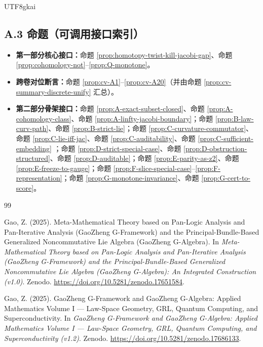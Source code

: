 \documentclass[12pt]{article}
\begin{document}
\begin{CJK*}{UTF8}{gkai}
\subsection*{A.3 命题（可调用接口索引）}
\begin{itemize}
  \item \textbf{第一部分核心接口：}命题 \ref{prop:homotopy-twist-kill-jacobi-gap}、命题 \ref{prop:cohomology-not}--\ref{prop:Q-monotone}。
  \item \textbf{跨卷对位断言：}命题 \ref{prop:cv-A1}--\ref{prop:cv-A20}（并由命题 \ref{prop:cv-summary-discrete-unify} 汇总）。
  \item \textbf{第二部分骨架接口：}命题 \ref{prop:A-exact-subset-closed}、命题 \ref{prop:A-cohomology-class}、命题 \ref{prop:A-linfty-jacobi-boundary}；命题 \ref{prop:B-law-curv-path}、命题 \ref{prop:B-strict-lie}；命题 \ref{prop:C-curvature-commutator}、命题 \ref{prop:C-lie-iff-jac}、命题 \ref{prop:C-auditability}、命题 \ref{prop:C-sufficient-embedding}
    ；命题 \ref{prop:D-strict-special-case}、命题 \ref{prop:D-obstruction-structured}、命题 \ref{prop:D-auditable}；命题 \ref{prop:E-parity-as-z2}、命题 \ref{prop:E-freeze-to-gauge}；命题 \ref{prop:F-slice-special-case}--\ref{prop:F-representation}；命题
    \ref{prop:G-monotone-invariance}、命题 \ref{prop:G-cert-to-score}。
\end{itemize}

\clearpage
\renewcommand{\refname}{\texorpdfstring{参考文献}{References}}
\begin{thebibliography}{99}

Gao, Z. (2025).
\newblock Meta-Mathematical Theory based on Pan-Logic Analysis and
Pan-Iterative Analysis (GaoZheng G-Framework) and the
Principal-Bundle-Based Generalized Noncommutative Lie Algebra
(GaoZheng G-Algebra).
\newblock In \emph{Meta-Mathematical Theory based on Pan-Logic Analysis and
Pan-Iterative Analysis (GaoZheng G-Framework) and the
Principal-Bundle-Based Generalized Noncommutative Lie Algebra
(GaoZheng G-Algebra): An Integrated Construction (v1.0)}.
\newblock Zenodo.
\newblock \url{https://doi.org/10.5281/zenodo.17651584}.


Gao, Z. (2025).
\newblock GaoZheng G-Framework and GaoZheng G-Algebra: Applied Mathematics Volume I — Law-Space Geometry, GRL, Quantum
  Computing, and Superconductivity.
\newblock In \emph{GaoZheng G-Framework and GaoZheng G-Algebra: Applied Mathematics Volume I — Law-Space Geometry, GRL,
  Quantum Computing, and Superconductivity (v1.2)}.
\newblock Zenodo.
\newblock \url{https://doi.org/10.5281/zenodo.17686133}.



\end{thebibliography}
\end{CJK*}
\end{document}
